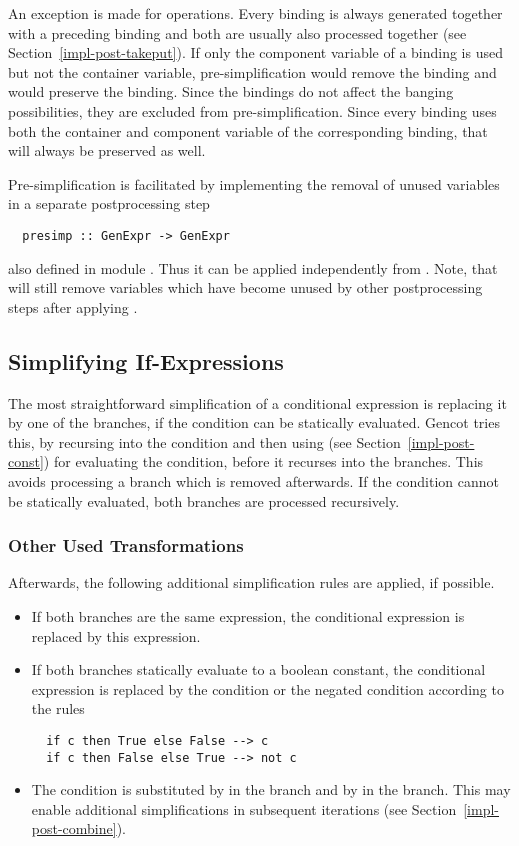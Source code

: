 An exception is made for  operations. Every  binding is always generated together with a preceding 
binding and both are usually also processed together (see Section~\ref{impl-post-takeput}). If only the component variable of a
 binding is used but not the container variable, pre-simplification would remove the  binding and would preserve
the  binding. Since the  bindings do not affect the banging possibilities, they are excluded from
pre-simplification. Since every  binding uses both the container and component variable of the corresponding 
binding, that will always be preserved as well.

Pre-simplification is facilitated by implementing the removal of unused variables in a separate postprocessing step
\begin{verbatim}
  presimp :: GenExpr -> GenExpr
\end{verbatim}
also defined in module . Thus it can be applied independently from . Note, that
 will still remove variables which have become unused by other postprocessing steps after applying .

\subsection{Simplifying If-Expressions}
\label{impl-post-if}

The most straightforward simplification of a conditional expression is replacing it by one of the branches, if the condition can be
statically evaluated. Gencot tries this, by recursing into the condition and then using  (see Section~\ref{impl-post-const})
for evaluating the condition, before it recurses into the branches. This avoids processing a branch which is removed afterwards. 
If the condition cannot be statically evaluated, both branches are processed recursively.

\subsubsection{Other Used Transformations}

Afterwards, the following additional simplification rules are applied, if possible.
\begin{itemize}
\item If both branches are the same expression, the conditional expression is replaced by this expression.
\item If both branches statically evaluate to a boolean constant, the conditional expression is replaced
by the condition or the negated condition according to the rules
\begin{verbatim}
  if c then True else False --> c
  if c then False else True --> not c
\end{verbatim}
\item The condition is substituted by  in the  branch and by  in the  branch. This 
may enable additional simplifications in subsequent iterations (see Section~\ref{impl-post-combine}).
\end{itemize}

